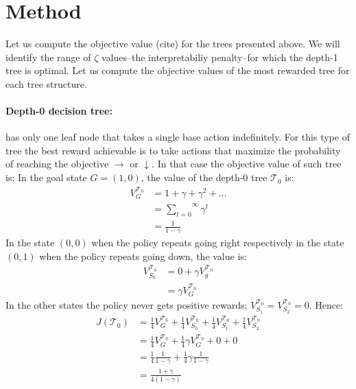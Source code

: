 \section{Method}
Let us compute the objective value (cite) for the trees presented above. We will identify the range of $\zeta$ values--the interpretabiliy penalty--for which the depth-1 tree is optimal. 
Let us compute the objective values of the most rewarded tree for each tree structure.
\paragraph{Depth-0 decision tree:} has only one leaf node that takes a single base action indefinitely.
For this type of tree the best reward achievable is to take actions that maximize the probability of reaching the objective $\rightarrow$ or $\downarrow$. In that case the objective value of such tree is:
In the goal state $G = (1, 0)$, the value of the depth-0 tree $\mathcal{T}_0$ is:
\begin{align*}
    V^{\mathcal{T}_0}_G &= 1 + \gamma + \gamma^2 + \dots \\
    &= \overset{\infty}{\underset{t=0}\sum} \gamma^t \\
    &= \frac{1}{1 - \gamma}
\end{align*}
In the state $(0, 0)$ when the policy repeats going right respectively in the state $(0, 1)$ when the policy repeats going down, the value is:
\begin{align*}
    V^{\mathcal{T}_0}_{S_0} &= 0 + \gamma V^{\mathcal{T}_0}_g \\
    &= \gamma V^{\mathcal{T}_0}_G
\end{align*}
In the other states the policy never gets positive rewards; $V^{\mathcal{T}_0}_{S_1} = V^{\mathcal{T}_0}_{S_2} = 0$. Hence:
\begin{align*}
J(\mathcal{T}_0) &= \frac{1}{4} V^{\mathcal{T}_0}_G + \frac{1}{4} V^{\mathcal{T}_0}_{S_0}+ \frac{1}{4} V^{\mathcal{T}_0}_{S_1}+ \frac{1}{4} V^{\mathcal{T}_0}_{S_2} \\
&= \frac{1}{4} V^{\mathcal{T}_0}_G + \frac{1}{4} \gamma V^{\mathcal{T}_0}_G + 0 + 0\\
&= \frac{1}{4} \frac{1}{1 - \gamma} + \frac{1}{4} \gamma \frac{1}{1 - \gamma} \\
&= \frac{1 + \gamma}{4(1 - \gamma)}
\end{align*}
